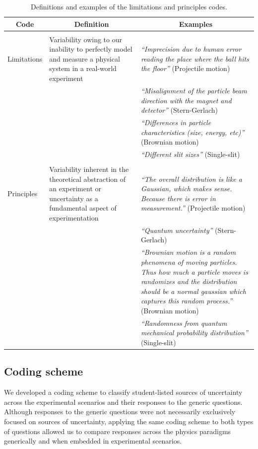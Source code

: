 \documentclass[english,aps,prstper,reprint,showpacs,longbibliography,superscriptaddress,nofootinbib]{revtex4-2}
\begin{document}
\begin{table}[tb] 
  \caption{Definitions and examples of the limitations and principles codes.}
  \label{ta:coding_scheme}
  \begin{ruledtabular}
    \begin{tabular}{p{}p{}p{}}
    \multicolumn{1}{c}{\textbf{Code}} & \multicolumn{1}{c}{\textbf{Definition}}& \multicolumn{1}{c}{\textbf{Examples}}\\
      \hline
      &&\\
    Limitations & Variability owing to our inability to perfectly model and measure a physical system in a real-world experiment & \textit{``Imprecision due to human error reading the place where the ball hits the floor''} (Projectile motion)\\
    && \textit{``Misalignment of the particle beam direction with the magnet and detector''} (Stern-Gerlach)\\
    &&\textit{``Differences in particle characteristics (size, energy, etc)''} (Brownian motion)\\
    &&\textit{``Different slit sizes''} (Single-slit)\\
    &&\\
    Principles & Variability inherent in the theoretical abstraction of an experiment or uncertainty as a fundamental aspect of experimentation & \textit{``The overall distribution is like a Gaussian, which makes sense. Because there is error in measurement.''} (Projectile motion) \\
    && \textit{``Quantum uncertainty''} (Stern-Gerlach) \\
    && \textit{ ``Brownian motion is a random phenomena of moving particles. Thus how much a particle moves is randomizes and the distribution should be a normal gaussian which captures this random process.''} (Brownian motion)\\
    & & \textit{ ``Randomness from quantum mechanical probability distribution''} (Single-slit)\\
    \end{tabular}
  \end{ruledtabular}
\end{table}

\subsection{Coding scheme}
\label{sec:coding_scheme}

We developed a coding scheme to classify student-listed sources of uncertainty across the experimental scenarios and their responses to the generic questions. Although responses to the generic questions were not necessarily exclusively focused on sources of uncertainty, applying the same coding scheme to both types of questions allowed us to compare responses across the physics paradigms generically and when embedded in experimental scenarios.
\end{document}
